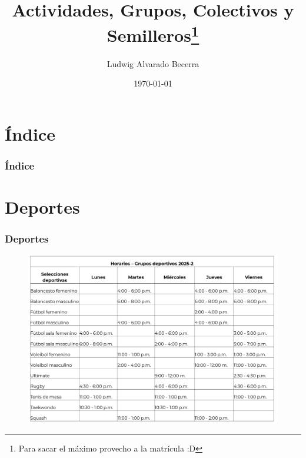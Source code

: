 \documentclass[17pt, t, lualatex]{beamer}
\title{Actividades, Grupos, Colectivos y Semilleros\footnote{Para sacar el máximo provecho a la matrícula :D } }
\date{\today}
\institute[UJTL]{Universidad Jorge Tadeo Lozano}
\author{Ludwig Alvarado Becerra}
\begin{document}
\inserttitlepage

\section{Índice}

\insertsectionpage

\begin{frame}
  \frametitle{Índice}
  \tableofcontents[hideallsubsections]
\end{frame}


\section{Deportes}

\begin{frame}
  \frametitle{Deportes}
  \begin{figure}
    \centering
    \includegraphics[height=0.9\textheight]{img/Deportes.png}
  \end{figure}

\end{frame}
\end{document}
